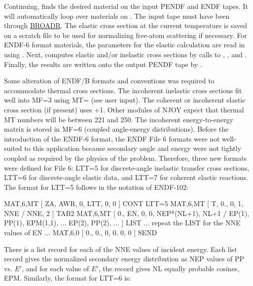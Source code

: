 Continuing,  finds the desired material on the input
PENDF and ENDF tapes.  It will automatically loop over
 materials on .  The input tape must have been
through \hyperlink{sBROADRhy}{BROADR}.  The
elastic cross section at the current
temperature is saved on a  scratch file to be used
for normalizing free-atom scattering if necessary.  For ENDF-6 format
materials, the parameters for the elastic calculation are read in
using .  Next,
 computes elastic and/or inelastic cross sections by
calls to ,
, and
.  Finally,
the results are written onto the output PENDF tape by
.

Some alteration of ENDF/B formats and conventions was required to
accommodate thermal cross sections.  The incoherent inelastic cross
sections fit well into MF=3 using MT= (see user input).
The coherent or incoherent elastic cross section (if present) uses
+1.  Other modules of NJOY expect that thermal MT numbers
will be between 221 and 250.  The incoherent energy-to-energy matrix is
stored in MF=6 (coupled angle-energy distributions).  Before the
introduction of the ENDF-6 format, the ENDF File 6 formats were not
well-suited to this application because secondary angle and energy
were not tightly coupled as required by the physics of the problem.
Therefore, three new formats were defined for File 6:
LTT=5 for discrete-angle inelastic transfer cross sections,
LTT=6 for discrete-angle elastic data, and
LTT=7 for coherent elastic reactions.
The format for LTT=5 follows in the notation of ENDF-102\cite{old102}:

\small
\begin{ccode}

   MAT,6,MT [ ZA, AWR, 0, LTT, 0, 0 ] CONT  LTT=5
   MAT,6,MT [ T, 0., 0, 1, NNE / NNE, 2 ] TAB2
   MAT,6,MT [ 0., EN, 0, 0, NEP*(NL+1), NL+1 /
              EP(1), PP(1), EPM(1,1), ...
              EP(2), PP(2), ... ] LIST
      ... repeat the LIST for the NNE values of EN ...
   MAT,6,0  [ 0., 0., 0, 0, 0, 0 ] SEND

\end{ccode}
\normalsize

\noindent
There is a list record for each of the NNE values of incident
energy.  Each list record gives the normalized secondary energy
distribution as NEP values of PP vs. $E'$, and for each value of $E'$,
the record gives NL equally probable cosines, EPM.
Similarly, the format for LTT=6 is:


